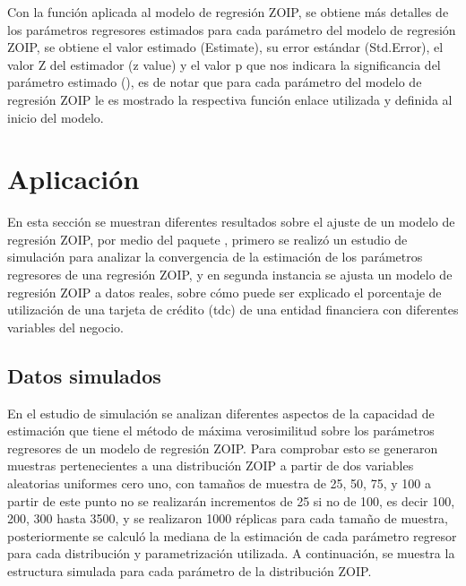 Con la funci\'{o}n  aplicada al modelo de regresi\'{o}n ZOIP, se obtiene m\'{a}s detalles de los par\'{a}metros regresores estimados para cada par\'{a}metro del modelo de regresi\'{o}n ZOIP, se obtiene el valor estimado (Estimate), su error est\'{a}ndar (Std.Error), el valor Z del estimador (z value) y el valor p que nos indicara la significancia del par\'{a}metro estimado (), es de notar que para cada par\'{a}metro del modelo de regresi\'{o}n ZOIP le es mostrado la respectiva funci\'{o}n enlace utilizada y definida al inicio del modelo.


\section{Aplicaci\'{o}n}
En esta secci\'{o}n se muestran diferentes resultados sobre el ajuste de un modelo de regresi\'{o}n ZOIP, por medio del paquete , primero se realiz\'{o} un estudio de simulaci\'{o}n para analizar la convergencia de la estimaci\'{o}n de los par\'{a}metros regresores de una regresi\'{o}n ZOIP, y en segunda instancia se ajusta un modelo de regresi\'{o}n ZOIP a datos reales, sobre c\'{o}mo puede ser explicado el porcentaje de utilizaci\'{o}n de una tarjeta de cr\'{e}dito (tdc) de una entidad financiera con diferentes variables del negocio.

\subsection{Datos simulados}
En el estudio de simulaci\'{o}n se analizan diferentes aspectos de la capacidad de estimaci\'{o}n que tiene el m\'{e}todo de m\'{a}xima verosimilitud sobre los par\'{a}metros regresores de un modelo de regresi\'{o}n ZOIP. Para comprobar esto se generaron muestras pertenecientes a una distribuci\'{o}n ZOIP a partir de dos variables aleatorias uniformes cero uno, con tama\~{n}os de muestra de 25, 50, 75, y 100 a partir de este punto no se realizar\'{a}n incrementos de 25 si no de 100, es decir 100, 200, 300 hasta 3500, y se realizaron 1000 r\'{e}plicas para cada tama\~{n}o de muestra, posteriormente se calcul\'{o} la mediana de la estimaci\'{o}n de cada par\'{a}metro regresor para cada distribuci\'{o}n y parametrizaci\'{o}n utilizada. A continuaci\'{o}n, se muestra la estructura simulada para cada par\'{a}metro de la distribuci\'{o}n ZOIP.\\

